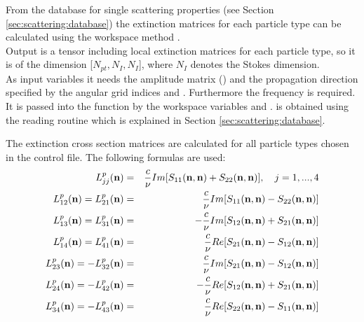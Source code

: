 From the database for single scattering properties (see Section 
\ref{sec:scattering:database}) the extinction matrices for each
particle type can be calculated using the workspace method
.\\
Output is a tensor including local extinction matrices for each
particle type, so it is of the dimension [$N_{pt}, N_{I}, N_{I}$],
where $N_{I}$ denotes the Stokes dimension.\\
As input variables it needs the amplitude matrix ()
and the propagation direction specified by the angular grid indices
 and . Furthermore the
frequency is required. It is passed into the function by the workspace
variables  and .
 is
obtained using the reading routine  which is
explained in Section \ref{sec:scattering:database}.


The extinction cross section matrices \SExMat{} are
calculated for all particle types chosen in the control
file. The following formulas are used:
\begin{eqnarray}
  \label{eq:gen_ext_matrix}
  L^p_{jj}({\bf n}) &=& \frac{c}{\nu} Im[S_{11}({\bf n},{\bf
    n})+S_{22}({\bf n},{\bf n})], \quad j=1,...,4 \\
  L^p_{12}({\bf n}) = L^p_{21}({\bf n}) &=& \frac{c}{\nu} Im[S_{11}({\bf n},{\bf
    n})-S_{22}({\bf n},{\bf n})]\\
  L^p_{13}({\bf n}) = L^p_{31}({\bf n}) &=& -\frac{c}{\nu} Im[S_{12}({\bf n},{\bf
    n})+S_{21}({\bf n},{\bf n})]\\
  L^p_{14}({\bf n}) = L^p_{41}({\bf n}) &=& \frac{c}{\nu} Re[S_{21}({\bf n},{\bf
    n})-S_{12}({\bf n},{\bf n})]\\
  L^p_{23}({\bf n}) = -L^p_{32}({\bf n}) &=& \frac{c}{\nu} Im[S_{21}({\bf n},{\bf
    n})-S_{12}({\bf n},{\bf n})]\\
  L^p_{24}({\bf n}) = -L^p_{42}({\bf n}) &=& -\frac{c}{\nu} Re[S_{12}({\bf n},{\bf
    n})+S_{21}({\bf n},{\bf n})]\\
  L^p_{34}({\bf n}) = -L^p_{43}({\bf n}) &=& \frac{c}{\nu} Re[S_{22}({\bf n},{\bf
    n})-S_{11}({\bf n},{\bf n})]
\end{eqnarray}


\label{sec:scattering:tot_pha_mat}

\label{sec:scattering:pha_mat}

